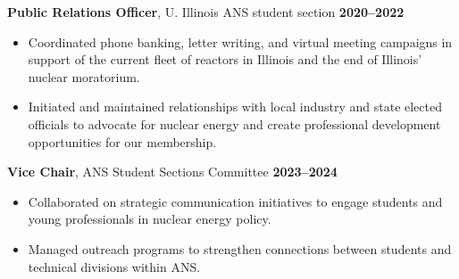 \documentclass[margin,line]{resume}
\begin{document}
\begin{resume}
    \textbf{Public Relations Officer}, U. Illinois ANS student section  \hfill \textbf{2020--2022}\vspace{.5mm}\\%
    \begin{itemize}
        \item Coordinated phone banking, letter writing, and virtual meeting campaigns in support of the current fleet of reactors in Illinois and the end of Illinois' nuclear moratorium.
        \item Initiated and maintained relationships with local industry and state elected officials to advocate for nuclear energy and create professional development opportunities for our membership.
    \end{itemize}

    \textbf{Vice Chair}, ANS Student Sections Committee  \hfill \textbf{2023--2024}\vspace{.5mm}\\%
    \begin{itemize}
        \item Collaborated on strategic communication initiatives to engage students and young professionals in nuclear energy policy.
        \item Managed outreach programs to strengthen connections between students and technical divisions within ANS.
    \end{itemize}

\end{resume}
\end{document}
